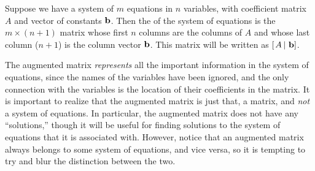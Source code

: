 \documentclass{ximera}
\begin{document}
\begin{definition}
Suppose we have a system of $m$ equations in $n$ variables, with coefficient matrix $A$ and vector of constants $\mathbf{b}$.  Then the  of the system of equations is the $m\times(n+1)$ matrix whose first $n$ columns are the columns of $A$ and whose last column ($n+1$) is the column vector $\mathbf{b}$.  This matrix will be written as $\left\lbrack\left.A\,\right\rvert\,\mathbf{b}\right\rbrack$.
\end{definition}

The augmented matrix \textit{represents} all the important information in the system of equations, since the names of the variables have been ignored, and the only connection with the variables is the location of their coefficients in the matrix.  It is important to realize that the augmented matrix is just that, a matrix, and \emph{not} a system of equations.  In particular, the augmented matrix does not have any ``solutions,'' though it will be useful for finding solutions to the system of equations that it is associated with.  However, notice that an augmented matrix always belongs to some system of equations, and vice versa, so it is tempting to try and blur the distinction between the two.
\end{document}
